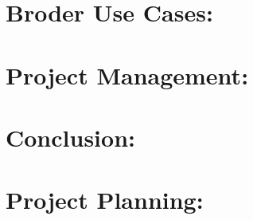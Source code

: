 \documentclass{article}
\begin{document}
\section{Broder Use Cases: }

\section{Project Management: }


\section{Conclusion:}


 



\section{Project Planning: }

  
\end{document}
